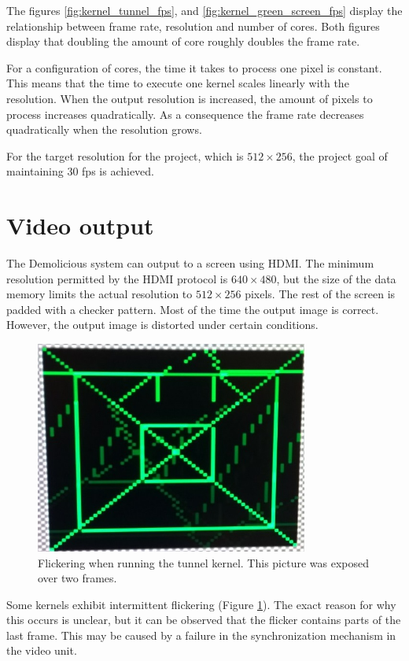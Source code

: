 \documentclass[../main/report.tex]{subfiles}
\begin{document}
The figures \ref{fig:kernel_tunnel_fps}, and \ref{fig:kernel_green_screen_fps} display the relationship between frame rate, resolution and number of cores.
Both figures display that doubling the amount of core roughly doubles the frame rate.

For a configuration of cores, the time it takes to process one pixel is constant.
This means that the time to execute one kernel scales linearly with the resolution.
When the output resolution is increased, the amount of pixels to process increases quadratically.
As a consequence the frame rate decreases quadratically when the resolution grows.
  
For the target resolution for the project, which is $512\times256$, the project goal of maintaining 30 fps is achieved.

\section{Video output}
The Demolicious system can output to a screen using HDMI.
The minimum resolution permitted by the HDMI protocol is $640\times480$,
but the size of the data memory limits the actual resolution to $512\times256$ pixels.
The rest of the screen is padded with a checker pattern.
Most of the time the output image is correct.
However, the output image is distorted under certain conditions.
\begin{figure}[H]
	\centering
	\includegraphics[width=0.8\textwidth]{../results/diagrams/flicker.jpg}
	\caption{Flickering when running the tunnel kernel. This picture was exposed over two frames.}
	\label{fig:flickering}
\end{figure}
Some kernels exhibit intermittent flickering (Figure \ref{fig:flickering}).
The exact reason for why this occurs is unclear, but
it can be observed that the flicker contains parts of the last frame. 
This may be caused by a failure in the synchronization mechanism in the video unit.
\end{document}
